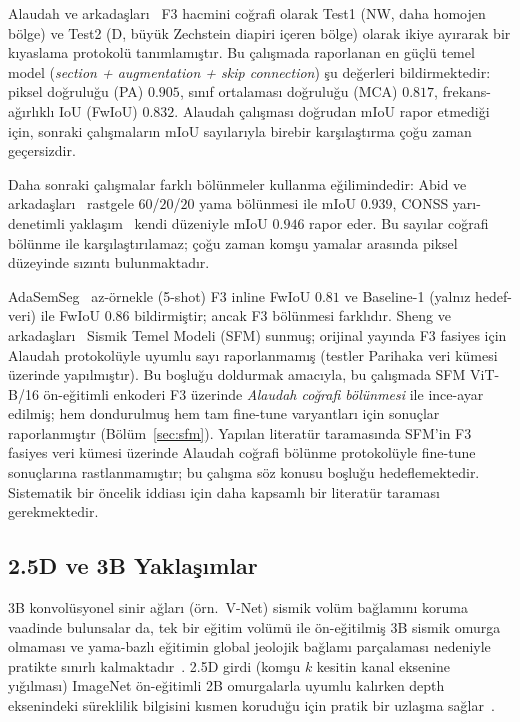 \documentclass[conference,a4paper,10pt]{IEEEtran}
\begin{document}
Alaudah ve arkadaşları~\cite{alaudah2019} F3 hacmini coğrafi olarak Test1 (NW, daha homojen
bölge) ve Test2 (D, büyük Zechstein diapiri içeren bölge) olarak ikiye ayırarak bir
kıyaslama protokolü tanımlamıştır. Bu çalışmada raporlanan en güçlü temel model
(\emph{section + augmentation + skip connection}) şu değerleri bildirmektedir:
piksel doğruluğu (PA) $0.905$, sınıf ortalaması doğruluğu (MCA) $0.817$,
frekans-ağırlıklı IoU (FwIoU) $0.832$. Alaudah çalışması doğrudan mIoU rapor etmediği
için, sonraki çalışmaların mIoU sayılarıyla birebir karşılaştırma çoğu zaman geçersizdir.

Daha sonraki çalışmalar farklı bölünmeler kullanma eğilimindedir: Abid ve
arkadaşları~\cite{abid2022} rastgele $60$/$20$/$20$ yama bölünmesi ile mIoU $0.939$,
CONSS yarı-denetimli yaklaşım~\cite{conss2023} kendi düzeniyle mIoU $0.946$ rapor
eder. Bu sayılar coğrafi bölünme ile karşılaştırılamaz; çoğu zaman komşu yamalar arasında
piksel düzeyinde sızıntı bulunmaktadır.

AdaSemSeg~\cite{adasemseg2025} az-örnekle (5-shot) F3 inline FwIoU $0.81$ ve
Baseline-1 (yalnız hedef-veri) ile FwIoU $0.86$ bildirmiştir; ancak F3 bölünmesi farklıdır.
Sheng ve arkadaşları~\cite{sfm2024} Sismik Temel Modeli (SFM) sunmuş; orijinal yayında
F3 fasiyes için Alaudah protokolüyle uyumlu sayı raporlanmamış (testler Parihaka veri
kümesi üzerinde yapılmıştır). Bu boşluğu doldurmak amacıyla, bu çalışmada SFM ViT-B/16
ön-eğitimli enkoderi F3 üzerinde \emph{Alaudah coğrafi bölünmesi} ile ince-ayar edilmiş;
hem dondurulmuş hem tam fine-tune varyantları için sonuçlar raporlanmıştır
(Bölüm~\ref{sec:sfm}). Yapılan literatür taramasında SFM'in F3 fasiyes
veri kümesi üzerinde Alaudah coğrafi bölünme protokolüyle fine-tune
sonuçlarına rastlanmamıştır; bu çalışma söz konusu boşluğu hedeflemektedir.
Sistematik bir öncelik iddiası için daha kapsamlı bir literatür taraması
gerekmektedir.

\subsection{2.5D ve 3B Yaklaşımlar}

3B konvolüsyonel sinir ağları (örn.\ V-Net) sismik volüm bağlamını koruma vaadinde
bulunsalar da, tek bir eğitim volümü ile ön-eğitilmiş 3B sismik omurga olmaması ve
yama-bazlı eğitimin global jeolojik bağlamı parçalaması nedeniyle pratikte sınırlı
kalmaktadır~\cite{liu2020}. 2.5D girdi (komşu $k$ kesitin kanal eksenine yığılması)
ImageNet ön-eğitimli 2B omurgalarla uyumlu kalırken depth eksenindeki süreklilik
bilgisini kısmen koruduğu için pratik bir uzlaşma sağlar~\cite{dou2023}.
\end{document}
